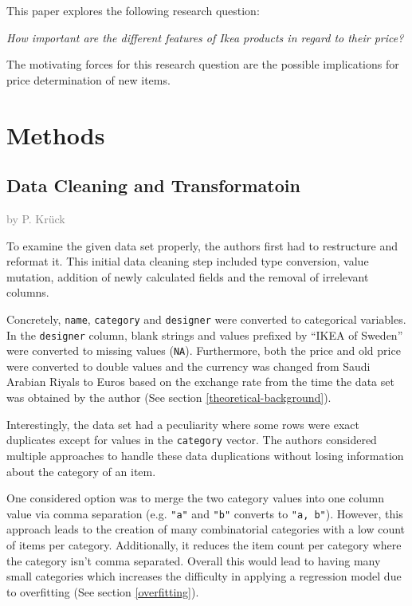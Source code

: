 \documentclass[a4paper, nobind]{templates/ociamthesis}
\begin{document}
This paper explores the following research question:

\emph{How important are the different features of Ikea products in regard to their price?}

The motivating forces for this research question are the possible implications for price determination of new items.

\hypertarget{methods}{%
\chapter{Methods}\label{methods}}

\hypertarget{datacleaning}{%
\section{Data Cleaning and Transformatoin}\label{datacleaning}}

\textcolor{gray}{by P. Krück}

To examine the given data set properly, the authors first had to restructure and reformat it. This initial data cleaning step included type conversion, value mutation, addition of newly calculated fields and the removal of irrelevant columns.

Concretely, \texttt{name}, \texttt{category} and \texttt{designer} were converted to categorical variables. In the \texttt{designer} column, blank strings and values prefixed by ``IKEA of Sweden'' were converted to missing values (\texttt{NA}). Furthermore, both the price and old price were converted to double values and the currency was changed from Saudi Arabian Riyals to Euros based on the exchange rate from the time the data set was obtained by the author (See section \ref{theoretical-background}).

Interestingly, the data set had a peculiarity where some rows were exact duplicates except for values in the \texttt{category} vector. The authors considered multiple approaches to handle these data duplications without losing information about the category of an item.

One considered option was to merge the two category values into one column value via comma separation (e.g. \texttt{"a"} and \texttt{"b"} converts to \texttt{"a,\ b"}). However, this approach leads to the creation of many combinatorial categories with a low count of items per category.
Additionally, it reduces the item count per category where the category isn't comma separated.
Overall this would lead to having many small categories which increases the difficulty in applying a regression model due to overfitting (See section \ref{overfitting}).
\end{document}
